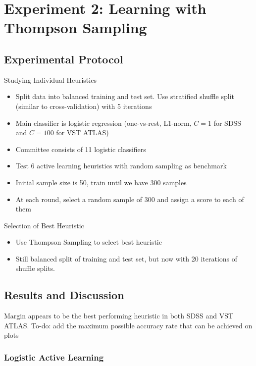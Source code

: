 

\chapter{Experiment 2: Learning with Thompson Sampling}
\label{cha:expt2}

\section{Experimental Protocol}
\label{sec:protocol2}

Studying Individual Heuristics
\begin{itemize}
	\item Split data into balanced training and test set. Use stratified shuffle split
	(similar to cross-validation) with 5 iterations
	\item Main classifier is logistic regression (one-vs-rest, L1-norm, $C=1$ for SDSS and $C=100$
	for VST ATLAS)
	\item Committee consists of 11 logistic classifiers
	\item Test 6 active learning heuristics with random sampling as benchmark
	\item Initial sample size is 50, train until we have 300 samples
	\item At each round, select a random sample of 300 and assign a score to each of them
\end{itemize}
Selection of Best Heuristic
\begin{itemize}
	\item Use Thompson Sampling to select best heuristic
	\item Still balanced split of training and test set, but now with 20 iterations of
	shuffle splits.
\end{itemize}

\section{Results and Discussion}
\label{sec:results2}
Margin appears to be the best performing heuristic in both SDSS and VST ATLAS.
To-do: add the maximum possible accuracy rate that can be achieved on plots

\subsection{Logistic Active Learning}

